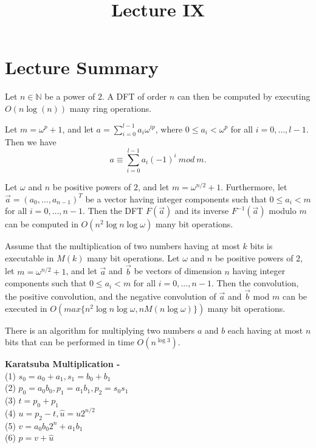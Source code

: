 \documentclass[a4paper]{article}
\title{\vspace{-2cm}Lecture IX\vspace{-2cm}}
\date{}
\begin{document}
\maketitle
\section{Lecture Summary}
\begin{theorem}
Let $n \in \mathbb{N}$ be a power of $2$. A DFT of order $n$ can then be computed by executing $O(n \log(n))$ many ring operations.
\end{theorem}


\begin{theorem}
Let $m = \omega^{p} + 1$, and let $a = \sum_{i=0}^{l - 1} a_{i}\omega^{ip}$, where $0 \leq a_{i} < \omega^{p}$ for all $i = 0, \ldots, l - 1$. Then we have
$$ a \equiv \sum_{i=0}^{l - 1}a_{i}(-1)^{i}\ mod\ m.$$
\end{theorem}


\begin{theorem}
Let $\omega$ and $n$ be positive powers of $2$, and let $m = \omega^{n/2} + 1$. Furthermore, let $\vec{a} = (a_{0}, \ldots, a_{n-1})^{T}$ be a vector having integer components such that $0 \leq a_{i} < m$ for all $i = 0,  \ldots, n - 1$. Then the DFT $F(\vec{a})$ and its inverse $F^{-1}(\vec{a})$ modulo $m$ can be computed in $O(n^{2}\log{n}\log{\omega})$ many bit operations.
\end{theorem}


\begin{corollary}
Assume that the multiplication of two numbers having at most $k$ bits is executable in $M(k)$ many bit operations. Let $\omega$ and $n$ be positive powers of $2$, let $m = \omega^{n/2} + 1$, and let $\vec{a}$ and $\vec{b}$ be vectors of dimension $n$ having integer components such that $0 \leq a_{i} < m$ for all $i = 0, \ldots, n - 1$. Then the convolution, the positive convolution, and the negative convolution of $\vec{a}$ and $\vec{b}$ mod $m$ can be executed in $O(max\{n^{2}\log{n}\log{\omega}, nM(n\log{\omega})\})$ many bit operations.
\end{corollary}


\begin{theorem}
There is an algorithm for multiplying two numbers $a$ and $b$ each having at most $n$ bits that can be performed in time $O(n^{\log{3}})$.
\end{theorem}


\begin{algorithm}
\textbf{Karatsuba Multiplication -}\\
(1) $s_{0} = a_{0} + a_{1}, s_{1} = b_{0} + b_{1}$ \\
(2) $p_{0} = a_{0}b_{0}, p_{1} = a_{1}b_{1}, p_{2} = s_{0}s_{1}$ \\
(3) $t = p_{0} + p_{1}$ \\
(4) $u = p_{2} - t, \hat{u} = u2^{n/2}$ \\
(5) $v = a_{0}b_{0}2^{n} + a_{1}b_{1}$ \\
(6) $p = v + \hat{u}$
\end{algorithm}
\end{document}
